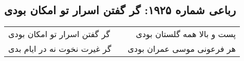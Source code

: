 \begin{center}
\section*{رباعی شماره ۱۹۲۵: گر گفتن اسرار تو امکان بودی}
\label{sec:1925}
\begin{longtable}{l p{0.5cm} r}
گر گفتن اسرار تو امکان بودی
&&
پست و بالا همه گلستان بودی
\\
گر غیرت نخوت نه در ایام بدی
&&
هر فرعونی موسی عمران بودی
\\
\end{longtable}
\end{center}
